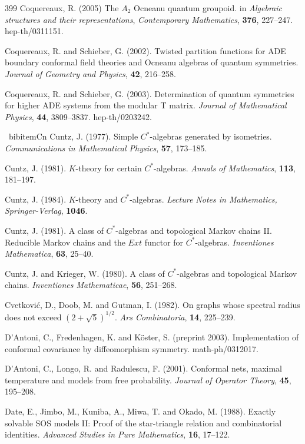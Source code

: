 \documentclass[12pt]{article}
\theoremstyle{plain}
\theoremstyle{definition}
\numberwithin{equation}{section}
\begin{document}
\begin{thebibliography} {399}
Coquereaux, R. (2005)
The $A_2$ Ocneanu quantum groupoid.
in {\em Algebraic structures and their representations}, 
{\em Contemporary Mathematics}, {\bf 376}, 227--247.
hep-th/0311151.

Coquereaux, R. and Schieber, G. (2002).
Twisted partition functions for ADE boundary conformal
field theories and Ocneanu algebras of quantum symmetries.
{\em Journal of Geometry and Physics}, {\bf 42}, 216--258.

Coquereaux, R. and Schieber, G. (2003).
Determination of quantum symmetries for higher ADE systems
from the modular T matrix.
{\em Journal of Mathematical Physics}, {\bf 44}, 3809--3837.
hep-th/0203242.

\ bibitem{Cn}
Cuntz, J. (1977).
Simple $C^*$-algebras generated by isometries.
{\em Communications in Mathematical Physics},
{\bf 57}, 173--185.

Cuntz, J. (1981).
$K$-theory for certain $C^*$-algebras.
{\em Annals of Mathematics},
{\bf 113}, 181--197.

Cuntz, J. (1984).
$K$-theory and $C^*$-algebras.
{\em Lecture Notes in Mathematics, Springer-Verlag},
{\bf 1046}.

Cuntz, J. (1981).
A class of $C^*$-algebras and topological Markov chains II.
Reducible Markov chains and the $Ext$ functor for
$C^*$-algebras.
{\em Inventiones Mathematica},
{\bf 63}, 25--40.

Cuntz, J. and Krieger, W. (1980).
A class of $C^*$-algebras and topological Markov chains.
{\em Inventiones Mathematicae},
{\bf 56}, 251--268.

Cvetkovi\'c, D., Doob, M. and Gutman, I. (1982).
On graphs whose spectral radius does not exceed $(2+\sqrt5)^{1/2}$.
{\em Ars Combinatoria}, {\bf 14}, 225--239.

D'Antoni, C., Fredenhagen, K. and K\"oster, S. (preprint 2003).
Implementation of conformal covariance by diffeomorphism symmetry.
math-ph/0312017.

D'Antoni, C., Longo, R. and Radulescu, F. (2001).
Conformal nets, maximal temperature and models from free probability.
{\em Journal of Operator Theory}, {\bf 45}, 195--208.

Date, E., Jimbo, M., Kuniba, A., Miwa, T. and Okado, M. (1988). 
Exactly solvable SOS models II:
Proof of the star-triangle relation and combinatorial identities.
{\em Advanced Studies in Pure Mathematics}, {\bf 16}, 17--122.


\end{thebibliography}
\end{document}
